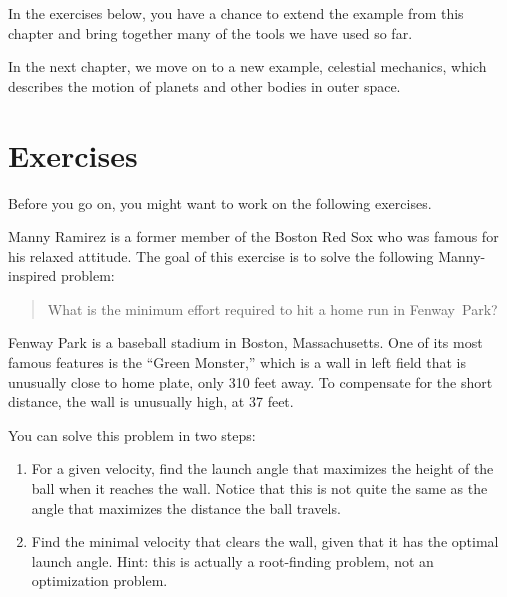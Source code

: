 In the exercises below, you have a chance to extend the example from this chapter and bring together many of the tools we have used so far.

In the next chapter, we move on to a new example, celestial mechanics, which describes the motion of planets and other bodies in outer space.


\section{Exercises}

Before you go on, you might want to work on the following exercises.

\begin{ex}


Manny Ramirez is a former member of the Boston Red Sox who was famous for his relaxed attitude.  The goal of this exercise is to solve the following Manny-inspired problem:

\begin{quote}
What is the minimum effort required to hit a home run in Fenway~Park?
\end{quote}


Fenway Park is a baseball stadium in Boston, Massachusetts.  One of its most famous features is the ``Green Monster,'' which is a wall in left field that is unusually close to home plate, only 310 feet away.  To compensate for the short distance, the wall is unusually high, at 37 feet.


You can solve this problem in two steps:

\begin{enumerate}

\item For a given velocity, find the launch angle that maximizes the height of the ball when it reaches the wall.  Notice that this is not quite the same as the angle that maximizes the distance the ball travels.


\item Find the minimal velocity that clears the wall, given that it has the optimal launch angle.  Hint: this is actually a root-finding problem, not an optimization problem.

\end{enumerate}

\end{ex}


